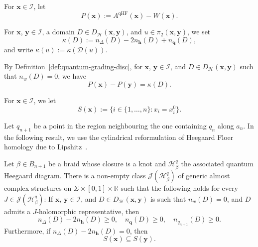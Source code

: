 \documentclass[11pt]{amsart}
\numberwithin{equation}{section}
\numberwithin{figure}{section}
\theoremstyle{definition}
\newcommand{\cD}{\mathcal{D}}
\newcommand{\cH}{\mathcal{H}}
\newcommand{\cI}{\mathcal{I}}
\newcommand{\cJ}{\mathscr{J}}
\newcommand{\bR}{\mathbb{R}}
\DeclareMathOperator{\qHF}{qHF}
\newcommand{\hs}{\boldsymbol{h}}
\newcommand{\qs}{\boldsymbol{q}}
\newcommand{\xs}{\boldsymbol{x}}
\newcommand{\ys}{\boldsymbol{y}}
\begin{document}
\begin{defn}\label{def:P}
    For $\xs \in \cI$, let
    \[
    P(\xs) := A^{\qHF}(\xs) - W(\xs).
    \]
\end{defn}

\begin{defn}
    For $\xs$, $\ys \in \cI$, a domain $D \in D_{\cH}(\xs,\ys)$, and $u \in \pi_2(\xs,\ys)$, we set
    \[
    \kappa(D) := n_{\Delta}(D) - 2n_{\hs}(D) + n_{\qs}(D), 
    \]
    and write $\kappa(u) := \kappa(\cD(u))$.
\end{defn}

By Definition~\ref{def:quantum-grading-disc}, for $\xs$, $\ys \in \cI$, and $D \in D_\cH(\xs,\ys)$ such that $n_w(D) = 0$, we have
\begin{equation}\label{eqn:P}
    P(\xs) - P(\ys) = \kappa(D).
\end{equation}

\begin{defn}
    For $\xs \in \cI$, we let
    \[
    S(\xs) := \{i \in \{1,\dots,n\} : x_i = x^0_i\}.
    \]
\end{defn}

Let $q_{n+1}$ be a point in the region neighbouring the one containing $q_n$ along $a_n$. In the following result, we use the cylindrical reformulation of Heegaard Floer homology due to Lipshitz~\cite{Lipshitz}.

\begin{prop}\label{prop:positivity}
    Let $\beta \in B_{n+1}$ be a braid whose closure is a knot and $\cH^q_\beta$ the associated quantum Heegaard diagram. There is a non-empty class $\cJ(\cH^q_\beta)$ of generic almost complex structures on $\Sigma \times [0,1] \times \bR$ such that the following holds for every $J \in \cJ(\cH^q_\beta)$: If $\xs$, $\ys \in \cI$, and $D \in D_{\cH}(\xs,\ys)$ is such that $n_w(D) = 0$, and $D$ admits a $J$-holomorphic representative, then
    \[
    n_{\Delta}(D) - 2n_{\hs}(D) \ge 0, \quad n_{\qs}(D) \ge 0, \quad n_{q_{n+1}}(D) \ge 0.
    \]
    Furthermore, if $n_{\Delta}(D) - 2n_{\hs}(D) = 0$, then
    \[
    S(\xs) \subseteq S(\ys).
    \]
\end{prop}
\end{document}
